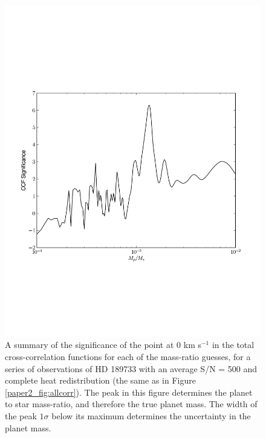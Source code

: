 \begin{figure}[ht]
  \centering
  \includegraphics[width=6.5in]{Figures/paper2_fig4.pdf}
  \caption{A summary of the significance of the point at 0 km s$^{-1}$ in the total cross-correlation functions for each of the mass-ratio guesses, for a series of observations of HD 189733 with an average S/N = 500 and complete heat redistribution (the same as in Figure \ref{paper2_fig:allcorr}). The peak in this figure determines the planet to star mass-ratio, and therefore the true planet mass. The width of the peak $1 \sigma$ below its maximum determines the uncertainty in the planet mass.}
  \label{paper2_fig:massratio}
\end{figure}
